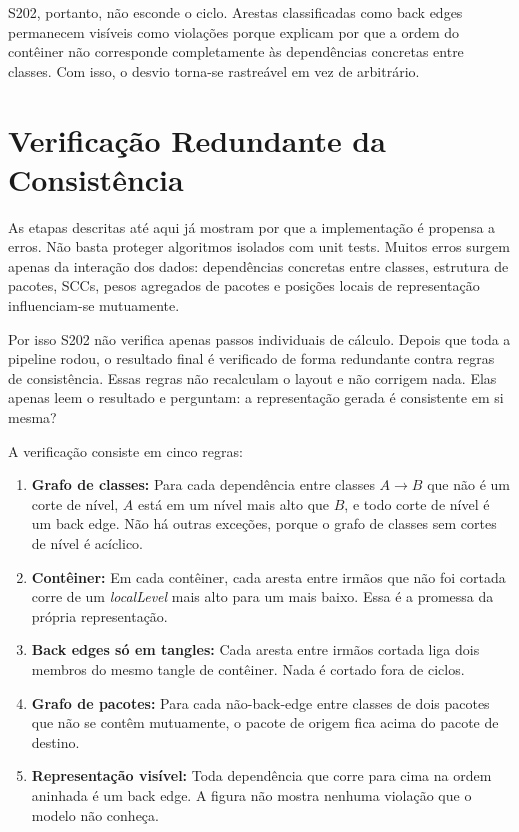 \documentclass[a4paper,11pt]{article}
\begin{document}
S202, portanto, n\~ao esconde o ciclo. Arestas classificadas como back edges
permanecem vis\'iveis como viola\c{c}\~oes porque explicam por que a ordem do
cont\^einer n\~ao corresponde completamente \`as depend\^encias concretas entre
classes. Com isso, o desvio torna-se rastre\'avel em vez de arbitr\'ario.

\section{Verifica\c{c}\~ao Redundante da Consist\^encia}

As etapas descritas at\'e aqui j\'a mostram por que a implementa\c{c}\~ao \'e
propensa a erros. N\~ao basta proteger algoritmos isolados com unit tests.
Muitos erros surgem apenas da intera\c{c}\~ao dos dados: depend\^encias
concretas entre classes, estrutura de pacotes, SCCs, pesos agregados de
pacotes e posi\c{c}\~oes locais de representa\c{c}\~ao influenciam-se
mutuamente.

Por isso S202 n\~ao verifica apenas passos individuais de c\'alculo. Depois
que toda a pipeline rodou, o resultado final \'e verificado de forma
redundante contra regras de consist\^encia. Essas regras n\~ao recalculam o
layout e n\~ao corrigem nada. Elas apenas leem o resultado e perguntam: a
representa\c{c}\~ao gerada \'e consistente em si mesma?

A verifica\c{c}\~ao consiste em cinco regras:

\begin{enumerate}
  \item \textbf{Grafo de classes:} Para cada depend\^encia entre classes
        $A \to B$ que n\~ao \'e um corte de n\'ivel, $A$ est\'a em um n\'ivel
        mais alto que $B$, e todo corte de n\'ivel \'e um back edge. N\~ao h\'a
        outras exce\c{c}\~oes, porque o grafo de classes sem cortes de n\'ivel
        \'e ac\'iclico.
  \item \textbf{Cont\^einer:} Em cada cont\^einer, cada aresta entre irm\~aos
        que n\~ao foi cortada corre de um \emph{localLevel} mais alto para um
        mais baixo. Essa \'e a promessa da pr\'opria representa\c{c}\~ao.
  \item \textbf{Back edges s\'o em tangles:} Cada aresta entre irm\~aos cortada
        liga dois membros do mesmo tangle de cont\^einer. Nada \'e cortado fora
        de ciclos.
  \item \textbf{Grafo de pacotes:} Para cada n\~ao-back-edge entre classes de
        dois pacotes que n\~ao se cont\^em mutuamente, o pacote de origem fica
        acima do pacote de destino.
  \item \textbf{Representa\c{c}\~ao vis\'ivel:} Toda depend\^encia que corre para
        cima na ordem aninhada \'e um back edge. A figura n\~ao mostra nenhuma
        viola\c{c}\~ao que o modelo n\~ao conhe\c{c}a.
\end{enumerate}
\end{document}

